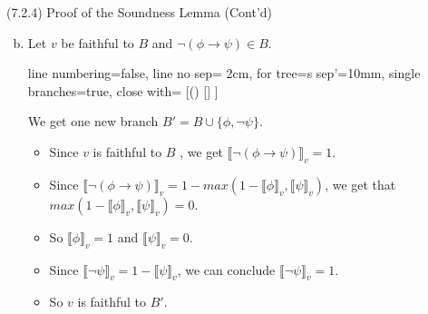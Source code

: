 \begin{frame}{(7.2.4)  Proof of the Soundness Lemma (Cont'd)}
	
	\begin{enumerate}[(a)]

	\setcounter{enumi}{1}
					
		\item Let $v$ be faithful to $B$ and $\neg(\phi\to\psi)\in B$.
				\begin{center}{\small
					\begin{prooftree}
					{
					line numbering=false,
					line no sep= 2cm,
					for tree={s sep'=10mm},
					single branches=true,
					close with=\xmark
					}
					[\neg(\phi\to\psi) [\phi [\neg\psi ] ] ]
					\end{prooftree}}
					\end{center}
			We get one new branch $B'=B\cup\{\phi,\neg\psi\}$.
			
			\begin{itemize}
			
				\item Since $v$ is faithful to $B$ , we get $\llbracket\neg(\phi\to\psi)\rrbracket_v=1$.
				
				\item Since $\llbracket\neg(\phi\to\psi)\rrbracket_v=1-max(1-\llbracket\phi\rrbracket_v, \llbracket\psi\rrbracket_v)$, we get that $max(1-\llbracket\phi\rrbracket_v, \llbracket\psi\rrbracket_v)=0$.
				
				\item So $\llbracket\phi\rrbracket_v=1$ and $\llbracket\psi\rrbracket_v=0$.
			
				\item Since $\llbracket\neg\psi\rrbracket_v=1-\llbracket\psi\rrbracket_v$, we can conclude  $\llbracket\neg\psi\rrbracket_v=1$.
				
				\item So $v$ is faithful to $B'$.
			
			\end{itemize}
					
	\end{enumerate}

\end{frame}

